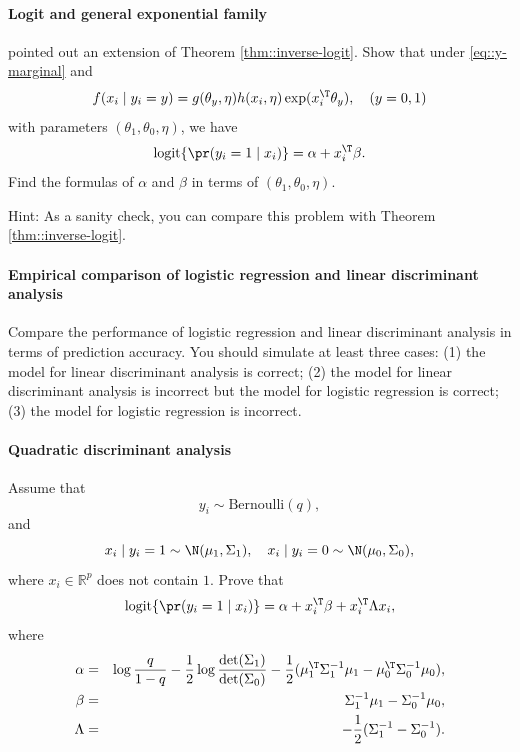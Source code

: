  

\paragraph{Logit and general exponential family}\label{hw17::logit-lda-exponential}
\citet{efron1975efficiency} pointed out an extension of Theorem \ref{thm::inverse-logit}. 
Show that under \eqref{eq::y-marginal} and 
$$
f(x_i\mid y_i = y) = g(\theta_y, \eta) h(x_i,\eta) \exp(x_i^{\T} \theta_y) ,\quad (y=0,1)
$$
with parameters $(\theta_1,\theta_0,\eta)$, 
we have
$$
\text{logit}\{  \pr(y_i =1\mid x_i) \} = \alpha + x_i^{\T} \beta.
$$
Find the formulas of $ \alpha $ and $\beta$ in terms of $(\theta_1,\theta_0,\eta)$. 


Hint: As a sanity check, you can compare this problem with Theorem \ref{thm::inverse-logit}. 

\paragraph{Empirical comparison of logistic regression and linear discriminant analysis}

Compare the performance of logistic regression and linear discriminant analysis in terms of prediction accuracy. You should simulate at least three cases: (1) the model for linear discriminant analysis is correct; (2) the model for linear discriminant analysis is incorrect but the model for logistic regression is correct; (3) the model for logistic regression is incorrect. 





\paragraph{Quadratic discriminant analysis}\label{hw17::QDA}



Assume that 
$$
y_{i}\sim\text{Bernoulli}(q),
$$
and
$$
x_{i}\mid y_{i}=1\sim\N(\mu_{1},\Sigma_1),\quad x_{i}\mid y_{i}=0\sim\N(\mu_{0},\Sigma_0),
$$ 
where $x_i \in \mathbb{R}^p$ does not contain $1$.
Prove that
$$
 \textup{logit}\{  \pr(y_i =1\mid x_i) \} = \alpha + x_i^{\T} \beta + x_i^{\T} \Lambda x_i , 
$$
where
\begin{eqnarray*}
\alpha &=&  \log \frac{q}{1-q} - \frac{1}{2} \log \frac{  \text{det} (\Sigma_1) }{  \text{det} (\Sigma_0) }
- \frac{1}{2} ( \mu_{1}^{\T}\Sigma_1^{-1}\mu_{1}-\mu_{0}^{\T}\Sigma_0^{-1}\mu_{0}  ),\\
\beta &=& \Sigma^{-1}_1 \mu_{1}- \Sigma^{-1}_0\mu_{0} , \\
\Lambda &=& - \frac{1}{2} ( \Sigma^{-1}_1 - \Sigma^{-1}_0 ).
\end{eqnarray*} 



